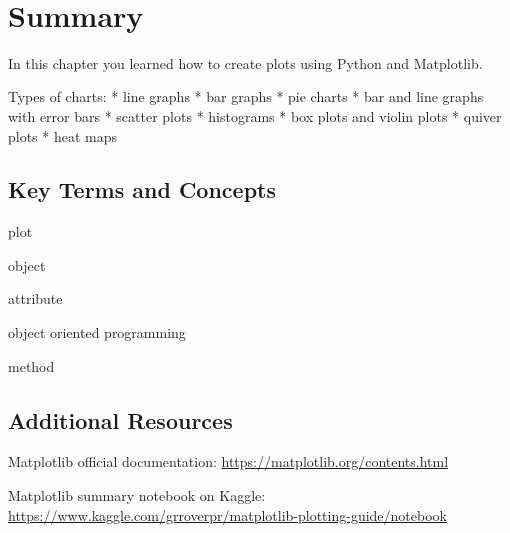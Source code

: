 \documentclass{book}
\begin{document}
    \begin{center}
    \end{center}
    { \hspace*{\fill} \\}
    

    
        \newpage
        \section{Summary}\label{summary}

    




    
        In this chapter you learned how to create plots using Python and
Matplotlib.
    




    
        Types of charts: * line graphs * bar graphs * pie charts * bar and line
graphs with error bars * scatter plots * histograms * box plots and
violin plots * quiver plots * heat maps
    




    
        \subsection{Key Terms and Concepts}\label{key-terms-and-concepts}

plot

object

attribute

object oriented programming

method
    




    
        \subsection{Additional Resources}\label{additional-resources}
    




    
        Matplotlib official documentation:
\url{https://matplotlib.org/contents.html}

Matplotlib summary notebook on Kaggle:
\url{https://www.kaggle.com/grroverpr/matplotlib-plotting-guide/notebook}
\end{document}
